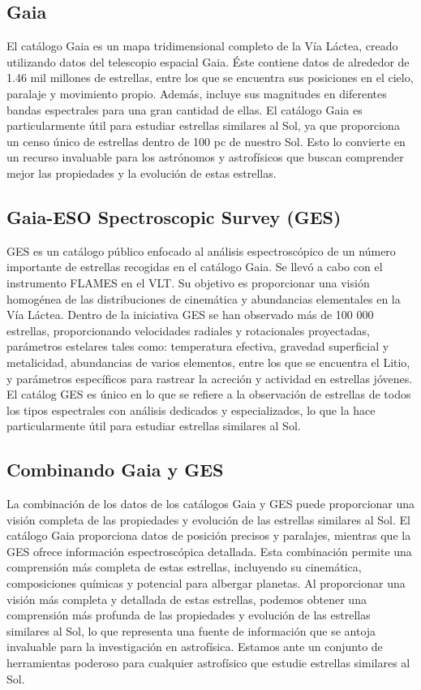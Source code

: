 \subsection{Gaia}
El catálogo Gaia es un mapa tridimensional completo de la Vía Láctea, creado utilizando datos del telescopio espacial Gaia. Éste contiene datos de alrededor de 1.46 mil millones de estrellas, entre los que se encuentra sus posiciones en el cielo, paralaje y movimiento propio. Además, incluye sus magnitudes en diferentes bandas espectrales para una gran cantidad de ellas. El catálogo Gaia es particularmente útil para estudiar estrellas similares al Sol, ya que proporciona un censo único de estrellas dentro de 100 pc de nuestro Sol. Esto lo convierte en un recurso invaluable para los astrónomos y astrofísicos que buscan comprender mejor las propiedades y la evolución de estas estrellas.\par

\subsection{Gaia-ESO Spectroscopic Survey (GES)}
GES es un catálogo público enfocado al análisis espectroscópico de un número importante de estrellas recogidas en el catálogo Gaia. Se llevó a cabo con el instrumento FLAMES en el VLT. Su objetivo es proporcionar una visión homogénea de las distribuciones de cinemática y abundancias elementales en la Vía Láctea. Dentro de la iniciativa GES se han observado más de 100 000 estrellas, proporcionando velocidades radiales y rotacionales proyectadas, parámetros estelares tales como: temperatura efectiva, gravedad superficial y metalicidad, abundancias de varios elementos, entre los que se encuentra el Litio, y parámetros específicos para rastrear la acreción y actividad en estrellas jóvenes. El catálog GES es único en lo que se refiere a la observación de estrellas de todos los tipos espectrales con análisis dedicados y especializados, lo que la hace particularmente útil para estudiar estrellas similares al Sol.\par

\subsection{Combinando Gaia y GES}

La combinación de los datos de los catálogos Gaia y GES puede proporcionar una visión completa de las propiedades y evolución de las estrellas similares al Sol. El catálogo Gaia proporciona datos de posición precisos y paralajes, mientras que la GES ofrece información espectroscópica detallada. Esta combinación permite una comprensión más completa de estas estrellas, incluyendo su cinemática, composiciones químicas y potencial para albergar planetas. Al proporcionar una visión más completa y detallada de estas estrellas, podemos obtener una comprensión más profunda de las propiedades y evolución de las estrellas similares al Sol, lo que representa una fuente de información que se antoja invaluable para la investigación en astrofísica. Estamos ante un conjunto de herramientas poderoso para cualquier astrofísico que estudie estrellas similares al Sol.\par

